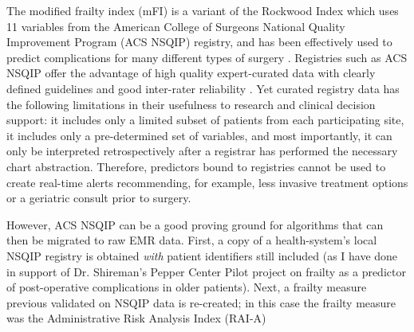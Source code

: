 The modified frailty index (mFI) is a variant of the Rockwood Index which uses 11 variables from the American College of Surgeons National Quality Improvement Program (ACS NSQIP) registry, and has been effectively used to predict complications for many different types of surgery \cite{Uppal_2015,Tsiouris_2013,Bellamy_2017,22491599,23711971,23949353}. Registries such as ACS NSQIP offer the advantage of high quality expert-curated data with clearly defined guidelines and good inter-rater reliability \cite{Shiloach_2010}. Yet curated registry data has the following limitations in their usefulness to research and clinical decision support: it includes only a limited subset of patients from each participating site, it includes only a pre-determined set of variables, and most importantly, it can only be interpreted retrospectively after a registrar has performed the necessary chart abstraction. Therefore, predictors bound to registries cannot be used to create real-time alerts recommending, for example, less invasive treatment options or a geriatric consult prior to surgery.

However, ACS NSQIP can be a good proving ground for algorithms that can then be migrated to raw EMR data. First, a copy of a health-system's local NSQIP registry is obtained \textit{with} patient identifiers still included (as I have done in support of Dr. Shireman's Pepper Center Pilot project on frailty as a predictor of post-operative complications in older patients). Next, a frailty measure previous validated on NSQIP data is re-created; in this case the frailty measure was the Administrative Risk Analysis Index (RAI-A) \cite{Hall_2017,Johnson_2014,Melin_2015,Gupta_2011}
